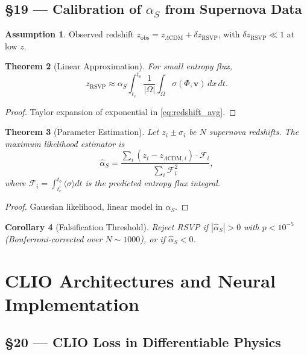 \documentclass[11pt]{article}
\newtheorem{theorem}{Theorem}[section]
\newtheorem{corollary}[theorem]{Corollary}
\theoremstyle{definition}
\newtheorem{assumption}[theorem]{Assumption}
\theoremstyle{remark}
\newcommand{\vect}[1]{\bm{#1}}
\begin{document}
\subsection*{§19 — Calibration of $\alpha_S$ from Supernova Data}

\begin{assumption}
\label{ass:calibration}
Observed redshift $z_{\mathrm{obs}} = z_{\Lambda\mathrm{CDM}} + \delta z_{\mathrm{RSVP}}$, with $\delta z_{\mathrm{RSVP}} \ll 1$ at low $z$.
\end{assumption}

\begin{theorem}[Linear Approximation]
For small entropy flux,
\[
z_{\mathrm{RSVP}} \approx \alpha_S \int_{t_e}^{t_o} \frac{1}{|\Omega|} \int_\Omega \sigma(\Phi,\vect{v})\,dx\,dt.
\]
\end{theorem}

\begin{proof}
Taylor expansion of exponential in \eqref{eq:redshift_avg}.
\end{proof}

\begin{theorem}[Parameter Estimation]
Let $z_i \pm \sigma_i$ be $N$ supernova redshifts. The maximum likelihood estimator is
\[
\hat{\alpha}_S = \frac{\sum_i (z_i - z_{\Lambda\mathrm{CDM},i}) \cdot \mathcal{F}_i}{\sum_i \mathcal{F}_i^2},
\]
where $\mathcal{F}_i = \int_{t_e^i}^{t_o} \langle \sigma \rangle dt$ is the predicted entropy flux integral.
\end{theorem}

\begin{proof}
Gaussian likelihood, linear model in $\alpha_S$.
\end{proof}

\begin{corollary}[Falsification Threshold]
Reject RSVP if $|\hat{\alpha}_S| > 0$ with $p < 10^{-5}$ (Bonferroni-corrected over $N \sim 1000$), or if $\hat{\alpha}_S < 0$.
\end{corollary}

\section{CLIO Architectures and Neural Implementation}

\subsection*{§20 — CLIO Loss in Differentiable Physics}
\end{document}
